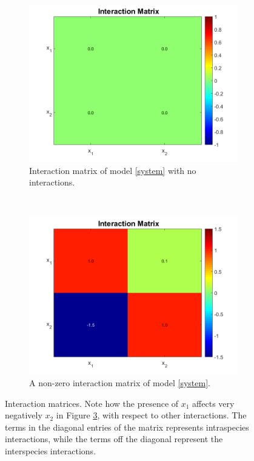 \documentclass[3p,times]{article}
\begin{document}
\begin{figure}[h]
	\centering
	\begin{subfigure}[b]{0.45\textwidth}
		\includegraphics[width = \textwidth]{Stability/Interactions_case_study_1_no_interactions}
		\caption{Interaction matrix of model \eqref{system} with no interactions.}
		\label{case1_no_interactions}
	\end{subfigure}
	~
	\begin{subfigure}[b]{0.45\textwidth}
		\includegraphics[width = \textwidth]{Stability/Interactions_case_study_1}
		\caption{A non-zero interaction matrix of model \eqref{system}.}
		\label{case1_interactions}
	\end{subfigure}
	\caption{Interaction matrices. Note how the presence of $x_1$ affects very negatively $x_2$ in Figure \ref{case1_interactions}, with respect to other interactions. The terms in the diagonal entries of the matrix represents intraspecies interactions, while the terms off the diagonal represent the interspecies interactions.}
\end{figure} 
\end{document}
